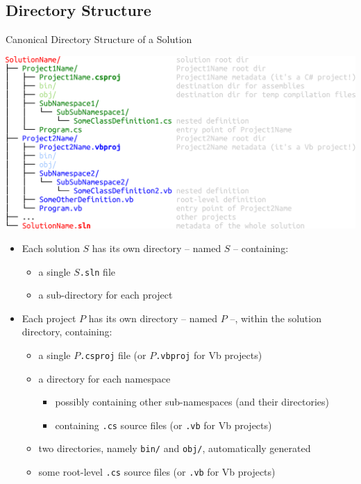 \documentclass[presentation]{beamer}
\begin{document}
\subsection{Directory Structure}

\begin{frame}[allowframebreaks]{Canonical Directory Structure of a \dotnet Solution}
    \begin{center}
        \includegraphics[width=\linewidth]{img/project-structure.pdf}
    \end{center}

    \framebreak

    \begin{itemize}
        \item Each solution $S$ has its own directory -- named $S$  -- containing:
        \begin{itemize}
            \item a single \alert{$S$\texttt{.sln}} file
            \item a sub-directory for each project
        \end{itemize}

        \bigskip

        \item Each project $P$ has its own directory -- named $P$ --, within the solution directory, containing:
        \begin{itemize}
            \item a single \alert{$P$\texttt{.csproj}} file (or $P$\texttt{.vbproj} for Vb projects)
            \item a directory for each namespace
            \begin{itemize}
                \item possibly containing other sub-namespaces (and their directories)
                \item containing \texttt{.cs} source files (or \texttt{.vb} for Vb projects)
            \end{itemize}
            \item two directories, namely \texttt{bin/} and \texttt{obj/}, automatically generated
            \item some root-level \texttt{.cs} source files (or \texttt{.vb} for Vb projects)
        \end{itemize}


\end{itemize}
\end{frame}
\end{document}
